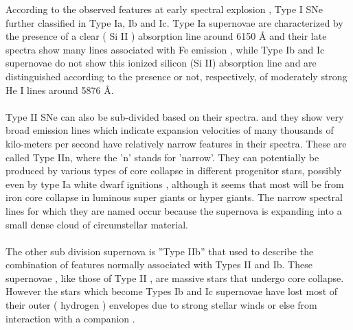 According to  the observed  features  at  early spectral explosion , Type I SNe further  classified  in  Type Ia,  Ib  and  Ic.  Type Ia  supernovae are characterized  by  the  presence  of  a clear ( Si II  )  absorption  line  around 6150 Å  and   their  late   spectra   show   many  lines  associated  with  Fe  emission , while Type Ib and Ic  supernovae  do  not show  this  ionized  silicon (Si II)  absorption  line and  are  distinguished  according  to  the  presence  or not, respectively, of moderately  strong  He I  lines  around 5876 Å.\citep{26}\\\\
Type II SNe  can  also  be  sub-divided  based on their spectra. and  they   show  very  broad  emission  lines  which  indicate  expansion velocities  of  many  thousands  of  kilo-meters  per  second  have   relatively narrow  features  in  their  spectra.  These  are  called  Type  IIn,  where  the ’n’ stands  for  ’narrow’.  They  can  potentially  be  produced  by various  types  of  core  collapse  in  different  progenitor  stars,  possibly  even by  type  Ia  white  dwarf  ignitions ,  although  it  seems  that  most  will  be from  iron  core  collapse  in  luminous  super giants  or  hyper giants. The  narrow spectral  lines  for  which  they  are  named  occur  because  the  supernova  is expanding  into  a small  dense  cloud  of  circumstellar  material.\citep{27}\\\\
The  other  sub  division supernova  is  ”Type IIb”  that   used  to  describe  the  combination  of features  normally  associated  with  Types II  and  Ib. These  supernovae , like those  of  Type II , are  massive  stars  that  undergo  core  collapse. However the stars  which  become  Types  Ib  and  Ic  supernovae  have  lost  most  of  their outer ( hydrogen )  envelopes  due  to  strong  stellar  winds  or  else  from interaction  with  a companion .\citep{26}\citep{27}
